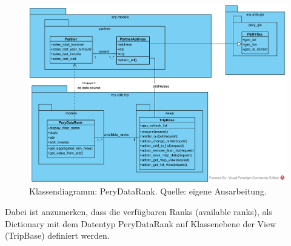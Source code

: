\documentclass[Bachelorarbeit.tex]{subfiles}
\begin{document}
\begin{figure}[H]
\centering
\includegraphics[width=0.9\linewidth]{img/Implementierung/ClassDiagrammRank}
\caption[Klassendiagramm: PeryDataRank]{Klassendiagramm: PeryDataRank. Quelle: eigene Ausarbeitung.}
\label{fig:ClassDiagrammRank}
\end{figure}

Dabei ist anzumerken, dass die verfügbaren Ranks (available ranks), als Dictionary mit dem Datentyp PeryDataRank auf Klassenebene der View (TripBase) definiert werden.
\end{document}
